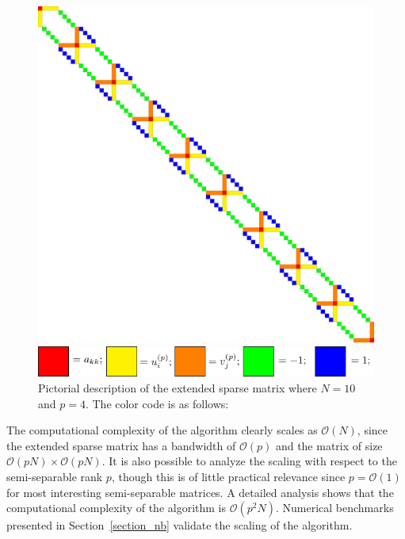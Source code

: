 \documentclass[final,leqno]{siamltex}
\begin{document}
\begin{figure}[!htbp]
\begin{center}
\includegraphics[scale=0.225]{./images/mtermsemiseparable/mtermsemiseparable_matrix.pdf}
\end{center}
\begin{center}
\includegraphics[scale=1]{./images/colorcode.pdf}
\end{center}
\caption{Pictorial description of the extended sparse matrix where $N=10$ and $p=4$. The color code is as follows: }
\label{fig_rankm_semiseparable}
\end{figure}

The computational complexity of the algorithm clearly scales as $\mathcal{O}(N)$, since the extended sparse matrix has a bandwidth of $\mathcal{O}(p)$ and the matrix of size $\mathcal{O}(pN) \times \mathcal{O}(pN)$. It is also possible to analyze the scaling with respect to the semi-separable rank $p$, though this is of little practical relevance since $p = \mathcal{O}(1)$ for most interesting semi-separable matrices. A detailed analysis shows that the computational complexity of the algorithm is $\mathcal{O}(p^2N)$. Numerical benchmarks presented in Section~\ref{section_nb} validate the scaling of the algorithm.
\end{document}
